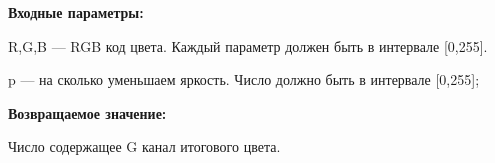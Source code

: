 \textbf{Входные параметры:}  

R,G,B --- RGB код цвета. Каждый параметр должен быть в интервале [0,255].

p --- на сколько уменьшаем яркость. Число должно быть в интервале [0,255];

\textbf{Возвращаемое значение:}

Число содержащее G канал итогового цвета.